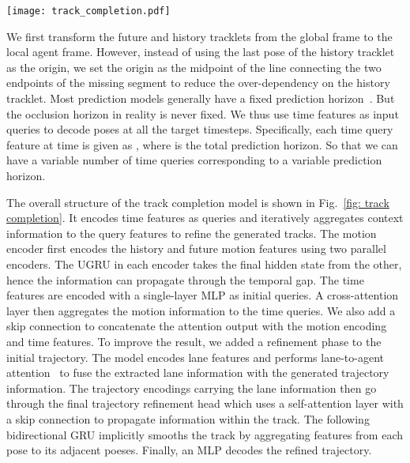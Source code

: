 \documentclass{article} \usepackage{iclr2023_conference,times}
\begin{document}
\begin{figure*}[htb]
\centering
\texttt{[image: track\_completion.pdf]}
\caption{A brief overview of the track completion model. The model stacks several sub-modules together to sequentially aggregate features and refine the results.  }
\label{fig: track completion}

\end{figure*}

We first transform the future and history tracklets from the global frame to the local agent frame. However, instead of using the last pose of the history tracklet as the origin, we set the origin as the midpoint of the line connecting the two endpoints of the missing segment to reduce the over-dependency on the history tracklet. 
Most prediction models generally have a fixed prediction horizon~\cite{laneGCN,PGP}. But the occlusion horizon in reality is never fixed. We thus use time features as input queries to decode poses at all the target timesteps. Specifically, each time query feature at time  is given as , where  is the total prediction horizon. So that we can have a variable number of time queries corresponding to a variable prediction horizon. 

The overall structure of the track completion model is shown in  Fig.~\ref{fig: track completion}. It encodes time features as queries and iteratively aggregates context information to the query features to refine the generated tracks. The motion encoder first encodes the history and future motion features using two parallel encoders. The UGRU in each encoder takes the final hidden state from the other, hence the information can propagate through the temporal gap. The time features are encoded with a single-layer MLP as initial queries. A cross-attention layer then aggregates the motion information to the time queries. We also add a skip connection to concatenate the attention output with the motion encoding and time features. To improve the result, we added a refinement phase to the initial trajectory. The model encodes lane features and performs lane-to-agent attention~\cite{laneGCN} to fuse the extracted lane information with the generated trajectory information. The trajectory encodings carrying the lane information then go through the final trajectory refinement head which uses a self-attention layer with a skip connection to propagate information within the track. The following bidirectional GRU implicitly smooths the track by aggregating features from each pose to its adjacent poeses. Finally, an MLP decodes the refined trajectory.
\end{document}
